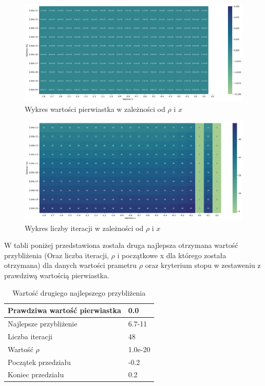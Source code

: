\documentclass{article}
\begin{document}
\begin{figure}[H]
  \centering
  \begin{minipage}[b]{0.9\textwidth}
    \includegraphics[width=\textwidth]{heatmap15.png}
  \end{minipage}
  \caption{Wykres wartości pierwiastka w zależności od \(\rho\) i \(x\)}
\end{figure}

\begin{figure}[H]
  \centering
  \begin{minipage}[b]{0.9\textwidth}
    \includegraphics[width=\textwidth]{heatmap16.png}
  \end{minipage}
  \caption{Wykres liczby iteracji w zależności od \(\rho\) i \(x\)}
\end{figure}

\noindent
W tabli poniżej przedstawiona została druga najlepsza otrzymana wartość przybliżenia (Oraz liczba iteracji, \(\rho\) i początkowe x dla którego została otrzymana) dla danych wartości prametru \(\rho\) oraz kryterium stopu w zestaweniu z prawdziwą wartością pierwiastka.

\begin{table}[H]
    \centering
    \begin{tabular}{|l|l|}
    \hline
        Prawdziwa wartość pierwiastka & 0.0 \\ \hline
        Najlepsze przybliżenie & 6.7-11 \\ \hline
        Liczba iteracji & 48 \\ \hline
        Wartość $\rho$ & 1.0e-20 \\ \hline
        Początek przedziału & -0.2 \\ \hline
        Koniec przedziału & 0.2 \\ \hline
    \end{tabular}
    \caption{Wartość drugiego najlepszego przybliżenia}
\end{table}
\end{document}

